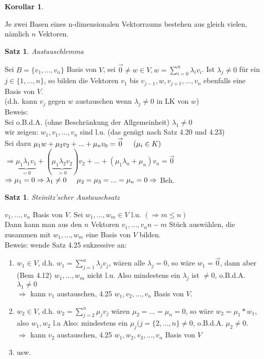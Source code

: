 \documentclass[a4paper,11pt]{article}
\newtheorem{satz}[definition]{Satz}
\newtheorem{koro}[definition]{Korollar}
\begin{document}
\begin{koro}
\end{koro}
Je zwei Basen eines n-dimensionalen Vektorraums bestehen aus gleich vielen, nämlich $n$ Vektoren.
\begin{satz}
Austauschlemma
\end{satz}
Sei $B=\{v_1,...,v_n\}$ Basis von $V$, sei $\overset{\rightarrow}{0}\neq w\in V,w=\sum^n_{i=0}\lambda_iv_i$. Ist $\lambda_j\neq0$ für ein $j\in\{1,...,n\}$, so bilden die Vektoren $v_1$ bis $v_{j-1}, w, v_{j+1},...,v_n$ ebenfalls eine Basis von $V$. \\
(d.h. kann $v_j$ gegen $w$ austauschen wenn $\lambda_j\neq 0$ in LK von $w$) \\
Beweis: \\
Sei o.B.d.A. (ohne Beschränkung der Allgemeinheit) $\lambda_1\neq0$ \\
wir zeigen: $w_1,v_1,...,v_n$ sind l.u. (das genügt nach Satz 4.20 und 4.23) \\
Sei dazu $\mu_1w+\mu_2v_2+...+\mu_nv_0=\overset{\rightarrow}{0}\hspace{5mm}(\mu_i\in K)$ \\
$\Rightarrow \underbrace{\mu_1\lambda_1v_1}_{=0}+(\underbrace{\mu_1\lambda_2v_2}_{=0})v_2+...+(\mu_1\lambda_n+\mu_n)v_n=\overset{\rightarrow}{0}$ \\
$\Rightarrow \mu_1=0\Rightarrow\lambda_1\neq0\hspace{5mm}\mu_2=\mu_3=...=\mu_n=0\Rightarrow$ Beh.
\begin{satz}
Steinitz'scher Austauschsatz
\end{satz}
$v_1,...,v_n$ Basis von $V$. Sei $w_1,...,w_m\in V$ l.u. $(\Rightarrow m\leq n)$ \\
Dann kann man aus den $n$ Vektoren $v_1,...,v_n n-m$ Stück auswählen, die zusammen mit $w_1,...,w_m$ eine Basis von $V$ bilden. \\
Beweis: wende Satz 4.25 sukzessive an: 
\begin{enumerate}[label=\arabic*)]
\item $w_1\in V$, d.h. $w_1=\sum^n_{j=1}\lambda_jv_j$, wären alle $\lambda_j=0$, so wäre $w_1=\overset{\rightarrow}{0}$, dann aber (Bem 4.12) $w_1,...,w_m$ nicht l.u. Also mindestens ein $\lambda_j$ ist $\neq0$, o.B.d.A. $\lambda_1\neq0$ \\
$\Rightarrow$ kann $v_1$ austauschen, 4.25 $w_1,v_2,...,v_n$ Basis von $V$.
\item $w_2\in V$, d.h. $w_2=\sum^n_{j=2}\mu_jv_j$ wären $\mu_2=...=\mu_n=0$, so wäre $w_2=\mu_1*w_1$, also $w_1,w_2$ l.a Also: mindestens ein $\mu_j (j=\{2,...,n\}\neq0$, o.B.d.A. $\mu_2\neq0$. \\
$\Rightarrow$ kann $v_2$ austauschen, 4.25 $w_1,w_2,v_3,...,v_n$ Basis von $V$
\item usw.
\end{enumerate}
\end{document}
